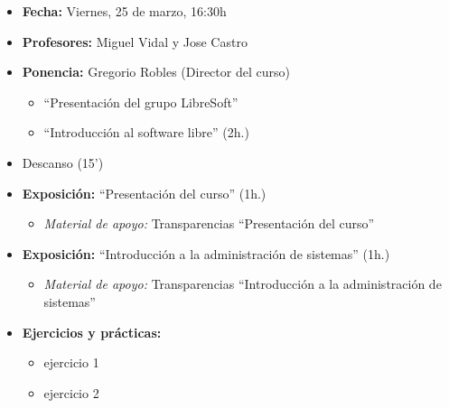 \begin{itemize}
  \item \textbf{Fecha:} Viernes, 25 de marzo, 16:30h
  \item \textbf{Profesores:} Miguel Vidal y Jose Castro
  \item \textbf{Ponencia:} Gregorio Robles (Director del curso)
    \begin{itemize}
      \item ``Presentación del grupo LibreSoft''
      \item ``Introducción al software libre'' (2h.)   
    \end{itemize}
  \item Descanso (15')
  \item \textbf{Exposición:} ``Presentación del curso'' (1h.)
    \begin{itemize}
      \item \textit{Material de apoyo:} Transparencias ``Presentación del curso'' 
    \end{itemize}
  \item \textbf{Exposición:} ``Introducción a la administración de sistemas'' (1h.)
    \begin{itemize}
      \item \textit{Material de apoyo:} Transparencias ``Introducción a la administración de sistemas''
    \end{itemize}
  \item \textbf{Ejercicios y prácticas:}
    \begin{itemize}
      \item ejercicio 1
      \item ejercicio 2
    \end{itemize}
\end{itemize}


